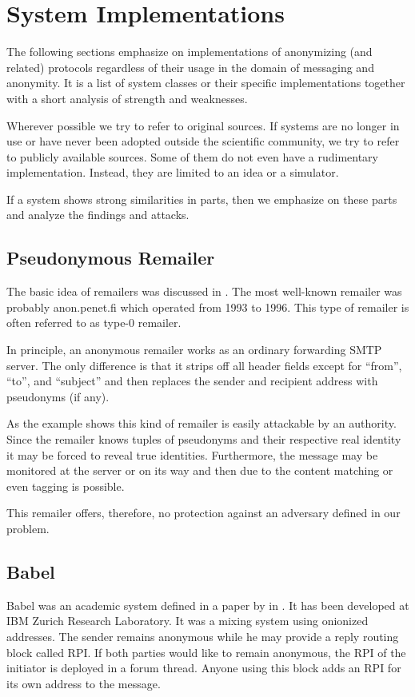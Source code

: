 \section{System Implementations\label{sec:sysImpl}}
The following sections emphasize on implementations of anonymizing (and related) protocols regardless of their usage in the domain of messaging and anonymity. It is a list of system classes or their specific implementations together with a short analysis of strength and weaknesses. 

Wherever possible we try to refer to original sources. If systems are no longer in use or have never been adopted outside the scientific community, we try to refer to publicly available sources. Some of them do not even have a rudimentary implementation. Instead, they are limited to an idea or a simulator.

If a system shows strong similarities in parts, then we emphasize on these parts and analyze the findings and attacks.

\subsection{Pseudonymous Remailer\label{sec:remPseudo}}
The basic idea of remailers was discussed in \cite{CHAUM1}. The most well-known remailer was probably anon.penet.fi which operated from 1993 to 1996. This type of remailer is often referred to as type-0 remailer.

In principle, an anonymous remailer works as an ordinary forwarding SMTP server. The only difference is that it strips off all header fields except for ``from'', ``to'', and ``subject'' and then replaces the sender and recipient address with pseudonyms (if any). 

As the example shows this kind of remailer is easily attackable by an authority. Since the remailer knows tuples of pseudonyms and their respective real identity it may be forced to reveal true identities. Furthermore, the message may be monitored at the server or on its way and then due to the content matching or even tagging is possible.

This remailer offers, therefore, no protection against an adversary defined in our problem.

\subsection{Babel}
Babel was an academic system defined in a paper by \citeauthor{babel} in \citeyear{babel}\cite{babel}. It has been developed at IBM Zurich Research Laboratory. It was a mixing system using onionized addresses. The sender remains anonymous while he may provide a reply routing block called RPI. If both parties would like to remain anonymous, the RPI of the initiator is deployed in a forum thread. Anyone using this block adds an RPI for its own address to the message.

